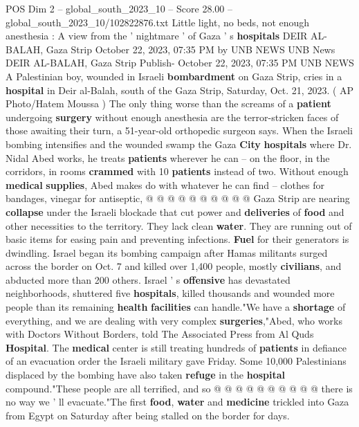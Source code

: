 \begin{textsample}{POS Dim 2 – global\_south\_2023\_10 – Score 28.00 – global\_south\_2023\_10/102822876.txt}  \label{ex:f2_pos_179}
Little light, no beds, not enough anesthesia : A view from the ' nightmare ' of Gaza ' s \textbf{hospitals} DEIR AL-BALAH, Gaza Strip October 22, 2023, 07:35 PM by UNB NEWS UNB News DEIR AL-BALAH, Gaza Strip Publish- October 22, 2023, 07:35 PM UNB NEWS A Palestinian boy, wounded in Israeli \textbf{bombardment} on Gaza Strip, cries in a \textbf{hospital} in Deir al-Balah, south of the Gaza Strip, Saturday, Oct. 21, 2023. ( AP Photo/Hatem Moussa ) The only thing worse than the screams of a \textbf{patient} undergoing \textbf{surgery} without enough anesthesia are the terror-stricken faces of those awaiting their turn, a 51-year-old orthopedic surgeon says.
When the Israeli bombing intensifies and the wounded swamp the Gaza \textbf{City} \textbf{hospitals} where Dr.
Nidal Abed works, he treats \textbf{patients} wherever he can -- on the floor, in the corridors, in rooms \textbf{crammed} with 10 \textbf{patients} instead of two.
Without enough \textbf{medical} \textbf{supplies}, Abed makes do with whatever he can find -- clothes for bandages, vinegar for antiseptic, @ @ @ @ @ @ @ @ @ @ Gaza Strip are nearing \textbf{collapse} under the Israeli blockade that cut power and \textbf{deliveries} of \textbf{food} and other necessities to the territory.
They lack clean \textbf{water}.
They are running out of basic items for easing pain and preventing infections. \textbf{Fuel} for their generators is dwindling.
Israel began its bombing campaign after Hamas militants surged across the border on Oct. 7 and killed over 1,400 people, mostly \textbf{civilians}, and abducted more than 200 others.
Israel ' s \textbf{offensive} has devastated neighborhoods, shuttered five \textbf{hospitals}, killed thousands and wounded more people than its remaining \textbf{health} \textbf{facilities} can handle."We have a \textbf{shortage} of everything, and we are dealing with very complex \textbf{surgeries},"Abed, who works with Doctors Without Borders, told The Associated Press from Al Quds \textbf{Hospital}.
The \textbf{medical} center is still treating hundreds of \textbf{patients} in defiance of an evacuation order the Israeli military gave Friday.
Some 10,000 Palestinians displaced by the bombing have also taken \textbf{refuge} in the \textbf{hospital} compound."These people are all terrified, and so @ @ @ @ @ @ @ @ @ @ there is no way we ' ll evacuate."The first \textbf{food}, \textbf{water} and \textbf{medicine} trickled into Gaza from Egypt on Saturday after being stalled on the border for days.

\end{textsample}
